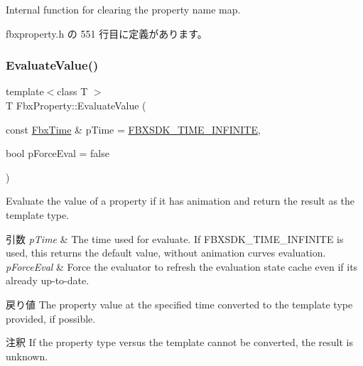 Internal function for clearing the property name map. 



 fbxproperty.\+h の 551 行目に定義があります。

\mbox{\label{class_fbx_property_a6256ee462711d9b236f345a4c7eb8a75}} 
\subsubsection{\texorpdfstring{Evaluate\+Value()}{EvaluateValue()}\hspace{0.1cm}{\footnotesize\ttfamily [1/2]}}
{\footnotesize\ttfamily template$<$class T $>$ \\
T Fbx\+Property\+::\+Evaluate\+Value (\begin{DoxyParamCaption}\item[{const \hyperlink{class_fbx_time}{Fbx\+Time} \&}]{p\+Time = {\ttfamily \hyperlink{fbxtime_8h_a1e6db3fe0f84f0b7daa775739f93526f}{F\+B\+X\+S\+D\+K\+\_\+\+T\+I\+M\+E\+\_\+\+I\+N\+F\+I\+N\+I\+TE}},  }\item[{bool}]{p\+Force\+Eval = {\ttfamily false} }\end{DoxyParamCaption})}

Evaluate the value of a property if it has animation and return the result as the template type. 
\begin{DoxyParams}{引数}
{\em p\+Time} & The time used for evaluate. If F\+B\+X\+S\+D\+K\+\_\+\+T\+I\+M\+E\+\_\+\+I\+N\+F\+I\+N\+I\+TE is used, this returns the default value, without animation curves evaluation. \\
\hline
{\em p\+Force\+Eval} & Force the evaluator to refresh the evaluation state cache even if its already up-\/to-\/date. \\
\hline
\end{DoxyParams}
\begin{DoxyReturn}{戻り値}
The property value at the specified time converted to the template type provided, if possible. 
\end{DoxyReturn}
\begin{DoxyRemark}{注釈}
If the property type versus the template cannot be converted, the result is unknown. 
\end{DoxyRemark}
\mbox{\label{class_fbx_property_ad581a049a2f336d6a3466fdd3c8c32c0}} 
